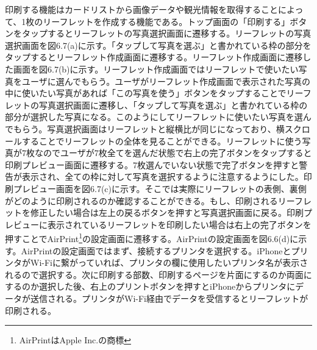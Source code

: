 印刷する機能はカードリストから画像データや観光情報を取得することによって、1枚のリーフレットを作成する機能である。トップ画面の「印刷する」ボタンをタップするとリーフレットの写真選択画面に遷移する。リーフレットの写真選択画面を図6.7(a)に示す。「タップして写真を選ぶ」と書かれている枠の部分をタップするとリーフレット作成画面に遷移する。リーフレット作成画面に遷移した画面を図6.7(b)に示す。リーフレット作成画面ではリーフレットで使いたい写真をユーザに選んでもらう。ユーザがリーフレット作成画面で表示された写真の中に使いたい写真があれば「この写真を使う」ボタンをタップすることでリーフレットの写真選択画面に遷移し、「タップして写真を選ぶ」と書かれている枠の部分が選択した写真になる。このようにしてリーフレットに使いたい写真を選んでもらう。写真選択画面はリーフレットと縦横比が同じになっており、横スクロールすることでリーフレットの全体を見ることができる。リーフレットに使う写真が7枚なのでユーザが7枚全てを選んだ状態で右上の完了ボタンをタップすると印刷プレビュー画面に遷移する。7枚選んでいない状態で完了ボタンを押すと警告が表示され、全ての枠に対して写真を選択するように注意するようにした。印刷プレビュー画面を図6.7(c)に示す。そこでは実際にリーフレットの表側、裏側がどのように印刷されるのか確認することができる。もし、印刷されるリーフレットを修正したい場合は左上の戻るボタンを押すと写真選択画面に戻る。印刷プレビューに表示されているリーフレットを印刷したい場合は右上の完了ボタンを押すことでAirPrint\footnote{AirPrintはApple Inc.の商標}の設定画面に遷移する。AirPrintの設定画面を図6.6(d)に示す。AirPrintの設定画面ではまず、接続するプリンタを選択する。iPhoneとプリンタがWi-Fiに繋がっていれば、プリンタの欄に使用したいプリンタ名が表示されるので選択する。次に印刷する部数、印刷するページを片面にするのか両面にするのか選択した後、右上のプリントボタンを押すとiPhoneからプリンタにデータが送信される。プリンタがWi-Fi経由でデータを受信するとリーフレットが印刷される。
